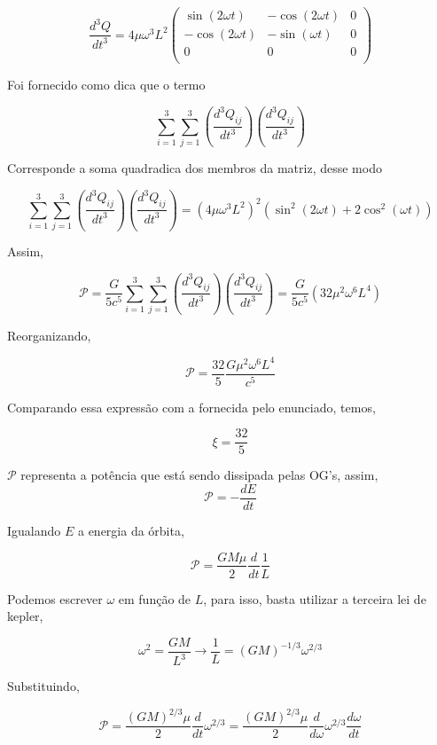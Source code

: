 \documentclass[11pt]{article}
\begin{document}
\begin{pproblem}
\begin{pssolution*}{}{}
\begin{alternativas}
        \[\frac{d^3Q}{dt^3} = 4\mu\omega^3L^2\left(\begin{matrix}
            \sin(2\omega t) & - \cos(2\omega t) & 0 \\
            -\cos(2\omega t) & - \sin(\omega t) & 0 \\
            0 & 0 & 0 \\
        \end{matrix}\right)\]

        Foi fornecido como dica que o termo 

        \[\sum_{i=1}^3 \sum_{j=1}^3 \left( \frac{d^3 Q_{ij}}{dt^3} \right) \left( \frac{d^3 Q_{ij}}{dt^3} \right)\]

        Corresponde a soma quadradica dos membros da matriz, desse modo 

        \[\sum_{i=1}^3 \sum_{j=1}^3 \left( \frac{d^3 Q_{ij}}{dt^3} \right) \left( \frac{d^3 Q_{ij}}{dt^3} \right) = (4\mu \omega^3 L^2)^2(\sin^2(2\omega t) + 2 \cos^2(\omega t))\]

        Assim, 

        \[\mathcal{P} = \frac{G}{5c^5} \sum_{i=1}^3 \sum_{j=1}^3 \left( \frac{d^3 Q_{ij}}{dt^3} \right) \left( \frac{d^3 Q_{ij}}{dt^3} \right) = \frac{G}{5c^5}(32\mu^2\omega^6 L^4)\]

        Reorganizando, 

        \[\mathcal{P} = \frac{32}{5}\frac{G\mu^2\omega^6L^4}{c^5}\]

        Comparando essa expressão com a fornecida pelo enunciado, temos, 

        \[\boxed{\xi = \frac{32}{5}}\]

        \item \(\mathcal{P}\) representa a potência que está sendo dissipada pelas OG's, assim, 
        \[\mathcal{P} = -\frac{dE}{dt}\]

        Igualando \(E\) a energia da órbita, 

        \[\mathcal{P} = \frac{GM\mu}{2} \frac{d}{dt}\frac{1}{L}\]

        Podemos escrever \(\omega\) em função de \(L\), para isso, basta utilizar a terceira lei de kepler, 


        \[\omega^2 = \frac{GM}{L^3} \rightarrow \frac{1}{L }= (GM)^{-1/3}\omega^{2/3}\]

        Substituindo, 

        \[\mathcal{P} = \frac{(GM)^{2/3}\mu}{2}\frac{d}{dt}\omega^{2/3} = \frac{(GM)^{2/3}\mu}{2}\frac{d}{d\omega}\omega^{2/3}\frac{d\omega}{dt}\]


\end{alternativas}
\end{pssolution*}
\end{pproblem}
\end{document}
